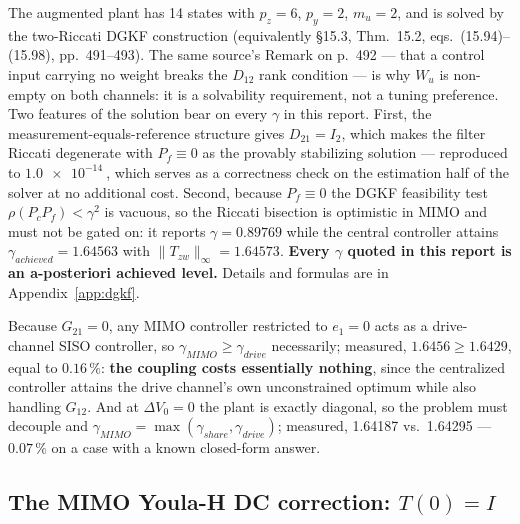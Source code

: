 \documentclass[energies,article,submit,pdftex,oneauthor]{Definitions/mdpi}
\begin{document}
The augmented plant has 14 states with $p_z = 6$, $p_y = 2$, $m_u = 2$, and is solved by the
two-Riccati DGKF construction \citep{doyle1989state} (equivalently
\citep{assadian2020neoclassical} \S15.3, Thm.~15.2, eqs.~(15.94)--(15.98), pp.~491--493). The
same source's Remark on p.~492 --- that a control input carrying no weight breaks the $D_{12}$
rank condition --- is why $W_u$ is non-empty on both channels: it is a solvability requirement,
not a tuning preference. Two features of the solution bear on
every $\gamma$ in this report. First, the measurement-equals-reference structure
gives $D_{21} = I_2$, which makes the filter Riccati degenerate with $P_f \equiv 0$ as the
provably stabilizing solution --- reproduced to $\SI{1.0e-14}{}$, which serves as a correctness
check on the estimation half of the solver at no additional cost. Second, because $P_f\equiv0$ the DGKF feasibility test
$\rho(P_c P_f)<\gamma^2$ is vacuous, so the Riccati bisection is optimistic in MIMO and must not be
gated on: it reports $\gamma = 0.89769$ while the central controller attains
$\gamma_{achieved} = \mathbf{1.64563}$ with $\|T_{zw}\|_\infty = 1.64573$. \textbf{Every $\gamma$
quoted in this report is an a-posteriori achieved level.} Details and formulas are in
Appendix~\ref{app:dgkf}.

Because $G_{21}=0$, any MIMO controller restricted to
$e_1 = 0$ acts as a drive-channel SISO controller, so $\gamma_{MIMO} \ge \gamma_{drive}$
necessarily; measured, $1.6456 \ge 1.6429$, equal to $0.16\,\%$: \textbf{the coupling costs
essentially nothing}, since the centralized controller
attains the drive channel's own unconstrained optimum while also handling $G_{12}$. And at
$\Delta V_0 = 0$ the plant is exactly diagonal, so the problem must decouple and
$\gamma_{MIMO} = \max(\gamma_{share}, \gamma_{drive})$; measured, \num{1.64187} vs.\
\num{1.64295} --- $0.07\,\%$ on a case with a known closed-form answer.

\subsection{The MIMO Youla-H DC correction: $T(0)=I$}
\label{sec:youlah}
\end{document}
